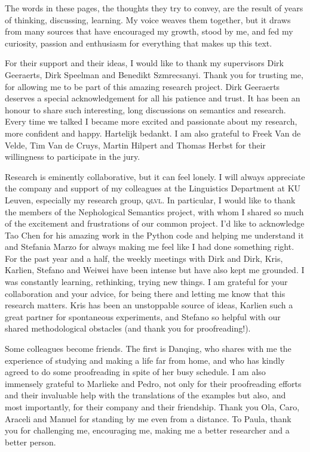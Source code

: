 \documentclass[
]{book}
\begin{document}
\fancyhead[LO,RE]{}
\fancyfoot[C]{}

The words in these pages, the thoughts they try to convey, are the result of years of thinking, discussing, learning. My voice weaves them together,
but it draws from many sources that have encouraged my growth, stood by me, and fed my curiosity, passion and enthusiasm for everything that makes up this text.

For their support and their ideas, I would like to thank my supervisors Dirk Geeraerts, Dirk Speelman and Benedikt Szmrecsanyi. Thank you for trusting me, for allowing me to be part of this amazing research project.
Dirk Geeraerts deserves a special acknowledgement for all his patience and trust. It has been an honour to share such interesting, long discussions on semantics and research.
Every time we talked I became more excited and passionate about my research, more confident and happy. Hartelijk bedankt.
I am also grateful to Freek Van de Velde, Tim Van de Cruys, Martin Hilpert and Thomas Herbst for their willingness to participate in the jury.

Research is eminently collaborative, but it can feel lonely. I will always appreciate the company and support of my colleagues at the Linguistics Department at KU Leuven, especially my research group, \textsc{qlvl}. In particular, I would like to thank the members of the Nephological Semantics project, with whom I shared so much of the excitement and frustrations of our common project. I'd like to acknowledge Tao Chen for his amazing work in the Python code and helping me understand it and Stefania Marzo for always making me feel like I had done something right. For the past year and a half, the weekly meetings with Dirk and Dirk, Kris, Karlien, Stefano and Weiwei have been intense but have also kept me grounded. I was constantly learning, rethinking, trying new things. I am grateful for your collaboration and your advice, for being there and letting me know that this research matters. Kris has been an unstoppable source of ideas, Karlien such a great partner for spontaneous experiments, and Stefano so helpful with our shared methodological obstacles (and thank you for proofreading!).

Some colleagues become friends. The first is Danqing, who shares with me the experience of studying and making a life far from home, and who has kindly agreed to do some proofreading in spite of her busy schedule. I am also immensely grateful to Marlieke and Pedro, not only for their proofreading efforts and their invaluable help with the translations of the examples but also, and most importantly, for their company and their friendship. Thank you Ola, Caro, Araceli and Manuel for standing by me even from a distance. To Paula, thank you for challenging me, encouraging me, making me a better researcher and a better person.
\end{document}
